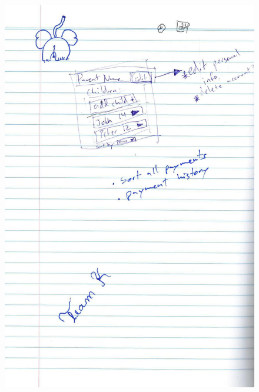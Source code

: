 \documentclass{l3proj}
\begin{document}
{
\begin{figure}[h]
\centering
\includegraphics[scale=0.50]{0085_001-page-002.jpg}
\end{figure}
}

\pagebreak
\end{document}
